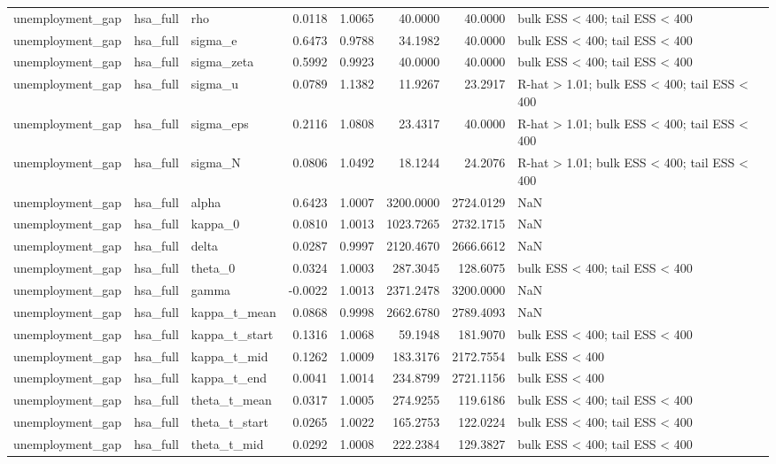 \begin{tabular}{lllrrrrl}
unemployment\_gap & hsa\_full & rho & 0.0118 & 1.0065 & 40.0000 & 40.0000 & bulk ESS < 400; tail ESS < 400 \\
unemployment\_gap & hsa\_full & sigma\_e & 0.6473 & 0.9788 & 34.1982 & 40.0000 & bulk ESS < 400; tail ESS < 400 \\
unemployment\_gap & hsa\_full & sigma\_zeta & 0.5992 & 0.9923 & 40.0000 & 40.0000 & bulk ESS < 400; tail ESS < 400 \\
unemployment\_gap & hsa\_full & sigma\_u & 0.0789 & 1.1382 & 11.9267 & 23.2917 & R-hat > 1.01; bulk ESS < 400; tail ESS < 400 \\
unemployment\_gap & hsa\_full & sigma\_eps & 0.2116 & 1.0808 & 23.4317 & 40.0000 & R-hat > 1.01; bulk ESS < 400; tail ESS < 400 \\
unemployment\_gap & hsa\_full & sigma\_N & 0.0806 & 1.0492 & 18.1244 & 24.2076 & R-hat > 1.01; bulk ESS < 400; tail ESS < 400 \\
unemployment\_gap & hsa\_full & alpha & 0.6423 & 1.0007 & 3200.0000 & 2724.0129 & NaN \\
unemployment\_gap & hsa\_full & kappa\_0 & 0.0810 & 1.0013 & 1023.7265 & 2732.1715 & NaN \\
unemployment\_gap & hsa\_full & delta & 0.0287 & 0.9997 & 2120.4670 & 2666.6612 & NaN \\
unemployment\_gap & hsa\_full & theta\_0 & 0.0324 & 1.0003 & 287.3045 & 128.6075 & bulk ESS < 400; tail ESS < 400 \\
unemployment\_gap & hsa\_full & gamma & -0.0022 & 1.0013 & 2371.2478 & 3200.0000 & NaN \\
unemployment\_gap & hsa\_full & kappa\_t\_mean & 0.0868 & 0.9998 & 2662.6780 & 2789.4093 & NaN \\
unemployment\_gap & hsa\_full & kappa\_t\_start & 0.1316 & 1.0068 & 59.1948 & 181.9070 & bulk ESS < 400; tail ESS < 400 \\
unemployment\_gap & hsa\_full & kappa\_t\_mid & 0.1262 & 1.0009 & 183.3176 & 2172.7554 & bulk ESS < 400 \\
unemployment\_gap & hsa\_full & kappa\_t\_end & 0.0041 & 1.0014 & 234.8799 & 2721.1156 & bulk ESS < 400 \\
unemployment\_gap & hsa\_full & theta\_t\_mean & 0.0317 & 1.0005 & 274.9255 & 119.6186 & bulk ESS < 400; tail ESS < 400 \\
unemployment\_gap & hsa\_full & theta\_t\_start & 0.0265 & 1.0022 & 165.2753 & 122.0224 & bulk ESS < 400; tail ESS < 400 \\
unemployment\_gap & hsa\_full & theta\_t\_mid & 0.0292 & 1.0008 & 222.2384 & 129.3827 & bulk ESS < 400; tail ESS < 400 \\

\end{tabular}
